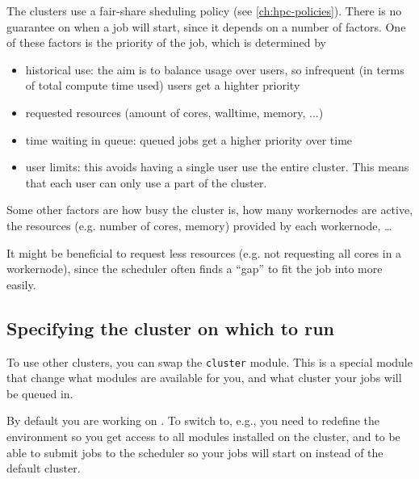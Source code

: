 The \hpcInfra clusters use a fair-share sheduling policy (see \autoref{ch:hpc-policies}). There is no guarantee on when a
job will start, since it depends on a number of factors. One of these factors is
the priority of the job, which is determined by
\begin{itemize}
    \item historical use: the aim is to balance usage over users, so
        infrequent (in terms of total compute time used) users get a highter priority

    \item requested resources (amount of cores, walltime, memory, ...)

    \item time waiting in queue: queued jobs get a higher priority over time

    \item user limits: this avoids having a single user use the entire cluster.
        This means that each user can only use a part of the cluster.

\end{itemize}
Some other factors are how busy the cluster is, how many workernodes are active,
the resources (e.g. number of cores, memory) provided by each workernode, \ldots

It might be beneficial to request less resources (e.g. not requesting all cores
in a workernode), since the scheduler often finds a ``gap'' to fit the job into
more easily.

\fi

\ifgent

\subsection{Specifying the cluster on which to run}
\label{subsec:specifying-the-cluster-on-which-to-run}

To use other clusters, you can swap the \lstinline|cluster| module.
This is a special module that change what modules are available for you,
and what cluster your jobs will be queued in.

By default you are working on . To switch to, e.g., \othercluster you need
to redefine the environment so you get access to all modules installed on
the \othercluster cluster, and to be able to submit jobs to the \othercluster scheduler
so your jobs will start on \othercluster instead of the default  cluster.

\begin{prompt}
\end{prompt}

